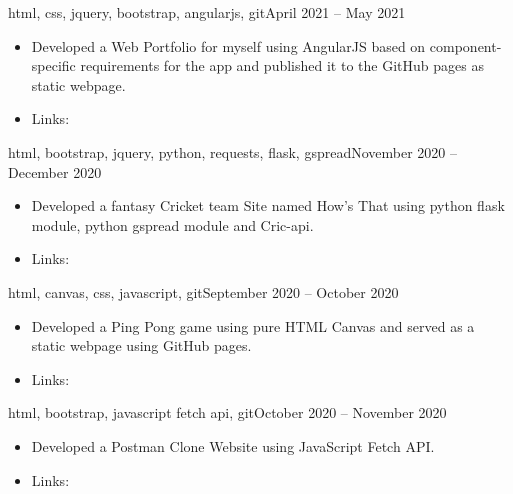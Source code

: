 \documentclass[10pt,a4paper]{altacv}
\begin{document}


{\MakeLowercase{HTML, CSS, jQuery, Bootstrap, AngularJS, Git}}{April 2021 -- May 2021}{}
\begin{itemize}
\item Developed a Web Portfolio for myself using AngularJS based on component-specific requirements for the app and published it to the GitHub pages as static webpage.
\item Links: 
\end{itemize}
\divider

{\MakeLowercase{html, Bootstrap, jquery, Python, requests, flask, gspread}}{November 2020 -- December 2020}{}
\begin{itemize}
\item Developed a fantasy Cricket team Site named How's That using python flask module, python gspread module and Cric-api.
\item Links: 
\end{itemize}
\divider

{\MakeLowercase{HTML, canvas, CSS, JavaScript, Git}}{September 2020 -- October 2020}{}
\begin{itemize}
\item Developed a Ping Pong game using pure HTML Canvas and served as a static webpage using GitHub pages.
\item Links: 
\end{itemize}
\divider



{\MakeLowercase{HTML, Bootstrap, javaScript fetch api, Git}}{October 2020 -- November 2020}{}
\begin{itemize}
\item Developed a Postman Clone Website using JavaScript Fetch API.
\item Links: 
\end{itemize}
\divider
\end{document}

